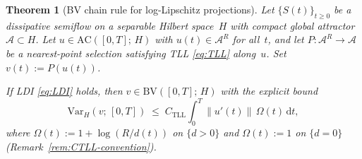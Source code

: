 \documentclass[12pt,a4paper]{article}
\theoremstyle{definition}
\theoremstyle{plain}
\newtheorem{theorem}[definition]{Theorem}
\theoremstyle{remark}
\newcommand{\Var}{\mathrm{Var}}
\newcommand{\AC}{\mathrm{AC}}
\newcommand{\BV}{\mathrm{BV}}
\begin{document}
\begin{theorem}[BV chain rule for log-Lipschitz projections]
\label{thm:BV-chain}
Let $\{S(t)\}_{t \ge 0}$ be a dissipative semiflow on a separable
Hilbert space~$H$ with compact global attractor
$\mathcal{A} \subset H$.  Let $u \in \AC([0,T];\, H)$ with
$u(t) \in \mathcal{A}^R$ for all~$t$, and let
$P: \mathcal{A}^R \to \mathcal{A}$ be a nearest-point selection
satisfying TLL \eqref{eq:TLL} along~$u$.  Set $v(t) := P(u(t))$.

If LDI \eqref{eq:LDI} holds, then
$v \in \BV([0,T];\, H)$ with the explicit bound
\begin{equation}\label{eq:BV-bound}
  \Var_H(v;\,[0,T])
  \;\le\;
  C_{\mathrm{TLL}}
  \int_0^T \|u'(t)\|\,\Omega(t)\,\mathrm{d}t,
\end{equation}
where $\Omega(t) := 1 + \log(R/d(t))$ on $\{d > 0\}$ and
$\Omega(t) := 1$ on $\{d = 0\}$
(Remark~\ref{rem:CTLL-convention}).
\end{theorem}
\end{document}
